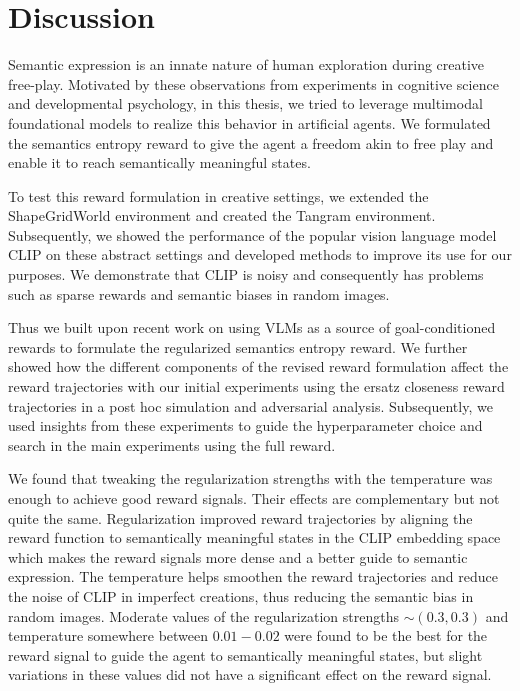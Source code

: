 \chapter{Discussion}
\label{sec:discussion}

Semantic expression is an innate nature of human exploration during creative free-play.
Motivated by these observations from experiments in cognitive science and developmental psychology, in this thesis, we tried to leverage multimodal foundational models to realize this behavior in artificial agents.
We formulated the semantics entropy reward to give the agent a freedom akin to free play and enable it to reach semantically meaningful states.

To test this reward formulation in creative settings, we extended the ShapeGridWorld environment and created the Tangram environment.
Subsequently, we showed the performance of the popular vision language model CLIP on these abstract settings and developed methods to improve its use for our purposes.
We demonstrate that CLIP is noisy and consequently has problems such as sparse rewards and semantic biases in random images.

Thus we built upon recent work on using VLMs as a source of goal-conditioned rewards to formulate the regularized semantics entropy reward.
We further showed how the different components of the revised reward formulation affect the reward trajectories with our initial experiments using the ersatz closeness reward trajectories in a post hoc simulation and adversarial analysis.
Subsequently, we used insights from these experiments to guide the hyperparameter choice and search in the main experiments using the full reward.


We found that tweaking the regularization strengths with the temperature was enough to achieve good reward signals.
Their effects are complementary but not quite the same.
Regularization improved reward trajectories by aligning the reward function to semantically meaningful states in the CLIP embedding space which makes the reward signals more dense and a better guide to semantic expression.
The temperature helps smoothen the reward trajectories and reduce the noise of CLIP in imperfect creations, thus reducing the semantic bias in random images.
Moderate values of the regularization strengths \(\sim (0.3, 0.3)\) and temperature somewhere between \(0.01 - 0.02\)  were found to be the best for the reward signal to guide the agent to semantically meaningful states, but slight variations in these values did not have a significant effect on the reward signal.

